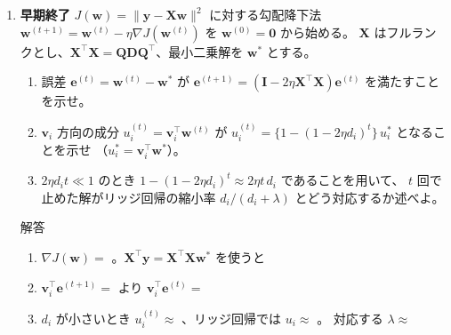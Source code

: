 \documentclass[a4paper,dvipdfmx]{jsarticle}
\newcommand{\提出期限}{2026年11月2日（月）}
\newcommand{\学籍番号}{0000000}
\newcommand{\氏名}{氏名を書く}
\newcommand{\提出日}{2026年11月2日}
\newenvironment{answer}{\begin{itembox}[l]{解答}}{\end{itembox}}
\begin{document}
\begin{enumerate}
  \item \textbf{早期終了}\quad
    $J(\bm{w}) = \|\bm{y} - \bm{X}\bm{w}\|^2$ に対する勾配降下法 $\bm{w}^{(t+1)} = \bm{w}^{(t)} - \eta\nabla J(\bm{w}^{(t)})$ を $\bm{w}^{(0)} = \bm{0}$ から始める。
    $\bm{X}$ はフルランクとし、$\bm{X}^\top\bm{X} = \bm{Q}\bm{D}\bm{Q}^\top$、最小二乗解を $\bm{w}^*$ とする。
    \begin{enumerate}
      \item 誤差 $\bm{e}^{(t)} = \bm{w}^{(t)} - \bm{w}^*$ が $\bm{e}^{(t+1)} = (\bm{I} - 2\eta\bm{X}^\top\bm{X})\bm{e}^{(t)}$ を満たすことを示せ。
      \item $\bm{v}_i$ 方向の成分 $u_i^{(t)} = \bm{v}_i^\top\bm{w}^{(t)}$ が $u_i^{(t)} = \{1 - (1 - 2\eta d_i)^t\}\,u_i^*$ となることを示せ
        （$u_i^* = \bm{v}_i^\top\bm{w}^*$）。
      \item $2\eta d_i t \ll 1$ のとき $1 - (1 - 2\eta d_i)^t \approx 2\eta t\,d_i$ であることを用いて、
        $t$ 回で止めた解がリッジ回帰の縮小率 $d_i/(d_i + \lambda)$ とどう対応するか述べよ。
    \end{enumerate}
    \begin{answer}
      \begin{enumerate}
        \item $\nabla J(\bm{w}) = $ \phantom{XXXXXXXXXX}。$\bm{X}^\top\bm{y} = \bm{X}^\top\bm{X}\bm{w}^*$ を使うと
          \vspace{12mm}
        \item $\bm{v}_i^\top\bm{e}^{(t+1)} = $ \phantom{XXXXXXXXXX} より $\bm{v}_i^\top\bm{e}^{(t)} = $ \phantom{XXXXXXXXXX}
          \vspace{12mm}
        \item $d_i$ が小さいとき $u_i^{(t)} \approx $ \phantom{XXXXXX}、リッジ回帰では $u_i \approx $ \phantom{XXXXXX}。
          対応する $\lambda \approx $ \phantom{XXXXXX}
          \vspace{8mm}
      \end{enumerate}
    \end{answer}


\end{enumerate}
\end{document}
